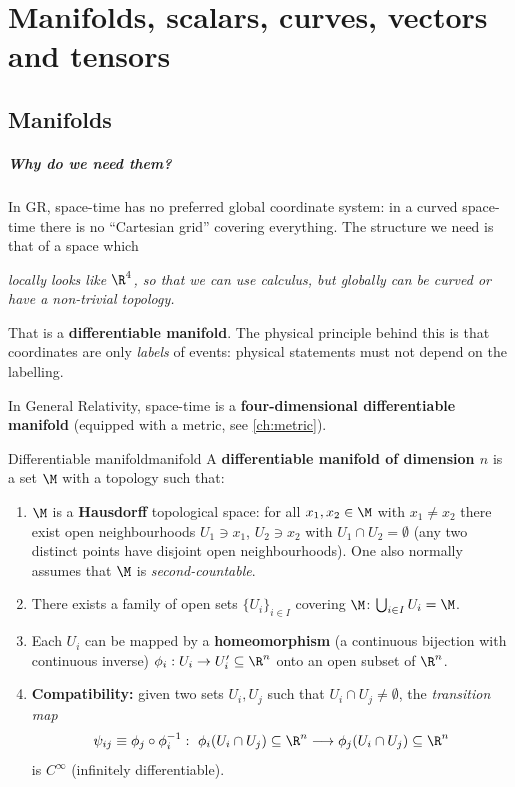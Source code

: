 \chapter{Manifolds, scalars, curves, vectors and tensors}\label{ch:manifolds}

\section{Manifolds}

\paragraph{Why do we need them?} In GR, space-time has no preferred global coordinate system: in a curved space-time there is no ``Cartesian grid'' covering everything. The structure we need is that of a space which
\begin{center}
\emph{locally looks like $\R^4$, so that we can use calculus, but globally can be curved or have a non-trivial topology.}
\end{center}
That is a \textbf{differentiable manifold}. The physical principle behind this is that coordinates are only \emph{labels} of events: physical statements must not depend on the labelling.

\begin{keyresult}
In General Relativity, space-time is a \textbf{four-dimensional differentiable manifold} (equipped with a metric, see \cref{ch:metric}).
\end{keyresult}

\begin{definition}{Differentiable manifold}{manifold}
A \textbf{differentiable manifold of dimension $n$} is a set $\M$ with a topology such that:
\begin{enumerate}[label=(\roman*)]
\item $\M$ is a \textbf{Hausdorff} topological space: for all $x_1,x_2\in\M$ with $x_1\neq x_2$ there exist open neighbourhoods $U_1\ni x_1$, $U_2\ni x_2$ with $U_1\cap U_2=\emptyset$ (any two distinct points have disjoint open neighbourhoods). One also normally assumes that $\M$ is \emph{second-countable}.
\item There exists a family of open sets $\{U_i\}_{i\in I}$ covering $\M$: $\bigcup_{i\in I}U_i=\M$.
\item Each $U_i$ can be mapped by a \textbf{homeomorphism} (a continuous bijection with continuous inverse) $\phi_i:U_i\to U_i'\subseteq\R^n$ onto an open subset of $\R^n$.
\item \textbf{Compatibility:} given two sets $U_i,U_j$ such that $U_i\cap U_j\neq\emptyset$, the \emph{transition map}
\begin{equation}
  \psi_{ij}\equiv\phi_j\circ\phi_i^{-1}:\ \phi_i(U_i\cap U_j)\subseteq\R^n\longrightarrow\phi_j(U_i\cap U_j)\subseteq\R^n
\end{equation}
is $C^\infty$ (infinitely differentiable).
\end{enumerate}
\end{definition}

